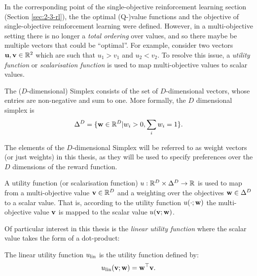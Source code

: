     In the corresponding point of the single-objective reinforcement learning section (Section \ref{sec:2-3-rl}), the the optimal (Q-)value functions and the objective of single-objective reinforcement learning were defined. However, in a multi-objective setting there is no longer a \textit{total ordering} over values, and so there maybe be multiple vectors that could be ``optimal''. For example, consider two vectors $\mathbf{u},\mathbf{v}\in\mathbb{R}^2$ which are such that $u_1 > v_1$ and $u_2 < v_2$. To resolve this issue, a \textit{utility function} or \textit{scalarisation function} is used to map multi-objective values to scalar values.

    \begin{defn}
        \label{def:2:simplex}
        \label{def:2:weight}
        \label{def:2:context}
        The \textnormal{($D$-dimensional) Simplex} consists of the set of $D$-dimensional vectors, whose entries are non-negative and sum to one. More formally, the $D$ dimensional simplex is 
        \begin{align}
            \Delta^D = \{\mathbf{w}\in\mathbb{R}^D|w_i > 0, \sum_i w_i = 1\}. \label{eq:2:simplex_def}
        \end{align}

        The elements of the $D$-dimensional Simplex will be referred to as \textnormal{weight vectors} (or just \textnormal{weights}) in this thesis, as they will be used to specify preferences over the $D$ dimensions of the reward function.
    \end{defn}

    \begin{defn}
        \label{def:2:utility_fn}
        \label{def:2:scalarisation_fn}
        A \textnormal{utility function} (or \textnormal{scalarisation function}) $u:\mathbb{R}^D\times\Delta^D \rightarrow \mathbb{R}$ is used to map from a multi-objective value $\mathbf{v}\in\mathbb{R}^D$ and a weighting over the objectives $\mathbf{w}\in\Delta^D$ to a scalar value. That is, according to the utility function $u(\cdot;\mathbf{w})$ the multi-objective value $\mathbf{v}$ is mapped to the scalar value $u(\mathbf{v};\mathbf{w})$.
    \end{defn}

    Of particular interest in this thesis is the \textit{linear utility function} where the scalar value takes the form of a dot-product:
    \begin{defn}
        \label{def:2:linear_utility_fn}
        \label{def:2:linear_scalarisation_fn}
        The \textnormal{linear utility function} $u_{{\textnormal{lin}}}$ is the utility function defined by:
        \begin{align}
            u_{{\textnormal{lin}}}(\mathbf{v};\mathbf{w}) = \mathbf{w}^\top \mathbf{v}. \label{eq:2:linear_utility_fn_def}
        \end{align}
    \end{defn}

